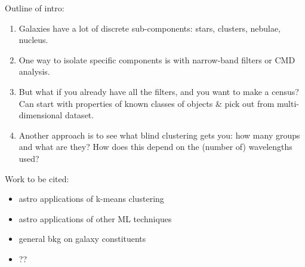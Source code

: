Outline of intro:

\begin{enumerate}
\item Galaxies have a lot of discrete sub-components: stars, clusters, nebulae, nucleus.
\item One way to isolate specific components is with narrow-band filters or CMD analysis.
\item But what if you already have all the filters, and you want to make a census? Can start
with properties of known classes of objects \& pick out from multi-dimensional dataset.
\item Another approach is to see what blind clustering gets you: how many groups and what are they?
How does this depend on the (number of) wavelengths used?
\end{enumerate}

Work to be cited: 
\begin{itemize}
\item astro applications of k-means clustering 
\item astro applications of other ML techniques
\item general bkg on galaxy constituents
\item ??
\end{itemize}
